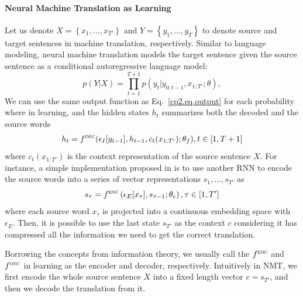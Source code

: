 \paragraph{Neural Machine Translation as \sts Learning} 
Let us denote $X=\left\{ x_1, \ldots, x_{T'} \right\}$ and $Y=\left\{ y_1, \ldots, y_T \right\}$ to denote source and target sentences in machine translation, respectively. Similar to language modeling, neural machine translation models the target sentence given the source sentence as a conditional autoregressive language model:
\begin{equation}
    p(Y|X) =  \prod_{t=1}^{T+1}p(y_t|y_{0:t-1}, x_{1:T'}; \theta),
\end{equation}
We can use the same output function as Eq.~\ref{cp2.eq.output} for each probability where in \sts learning, and the hidden states $h_t$ summarizes both the decoded and the source words
\begin{equation}
    \label{cp2.eq.hidden_state}
    \begin{split}
         h_t = f^{\textsc{dec}}(\epsilon_I[y_{t-1}], h_{t-1}, c_t(x_{1:T'}); {\theta}_f), t \in [1, T+1]
    \end{split}
\end{equation}
where $c_t(x_{1:T'})$ is the context representation of the source sentence $X$. For instance, a simple implementation proposed in  is to use another RNN to encode the source words into a series of vector representations $s_1, ..., s_{T'}$ as 
\begin{equation}
    \label{cp2.eq.rnn_encoder}
    s_\tau = f^{\textsc{enc}}\left(\epsilon_{E}[x_\tau], s_{\tau-1}; \theta_e\right),  \tau \in [1, T']
\end{equation}
where each source word $x_\tau$ is projected into a continuous embedding space with $\epsilon_{E}$. Then, it is possible to use the last state $s_{T'}$ as the context $c$ considering it has compressed all the information we need to get the correct translation.

Borrowing the concepts from information theory, we usually call the $ f^{\textsc{enc}}$ and $ f^{\textsc{dec}}$ in \sts learning as the encoder and decoder, respectively. Intuitively in NMT, we first encode the whole source sentence $X$ into a fixed length vector $c = s_{T'}$, and then we decode the translation from it.

